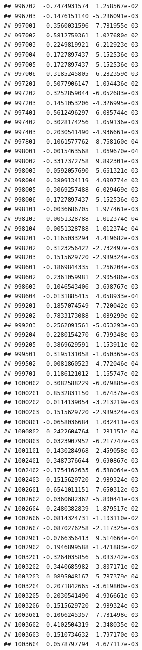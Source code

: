 \begin{frame}[fragile]
\begin{verbatim}
## 996702  -0.7474931574  1.258567e-02
## 996703  -0.1476151140 -5.286091e-03
## 997001  -0.3560031596 -7.781955e-03
## 997002  -0.5812759361  1.027680e-02
## 997003   0.2249819921 -6.212923e-03
## 997004  -0.1727897437  5.152536e-03
## 997005  -0.1727897437  5.152536e-03
## 997006  -0.3185245805  6.282359e-03
## 997201   0.5077906147 -1.094436e-02
## 997202   0.3252859044 -6.052683e-03
## 997203   0.1451053206 -4.326995e-03
## 997401  -0.5612496297  6.085744e-03
## 997402   0.3028174256  1.059136e-03
## 997403   0.2030541490 -4.936661e-03
## 997801   0.1061577762 -8.768160e-04
## 998001  -0.0015463568  1.069670e-04
## 998002  -0.3317372758  9.892301e-03
## 998003   0.0592057690  5.661321e-03
## 998004   0.3809134119  4.909774e-03
## 998005   0.3069257488 -6.029469e-03
## 998006  -0.1727897437  5.152536e-03
## 998101  -0.0036686705  1.977461e-03
## 998103  -0.0051328788  1.012374e-04
## 998104  -0.0051328788  1.012374e-04
## 998201  -0.1165033294  4.419682e-03
## 998202   0.3123256422 -2.732497e-03
## 998203   0.1515629720 -2.989324e-03
## 998601  -0.1869844335  1.266204e-03
## 998602   0.2361059981  2.905486e-03
## 998603   0.1046543406 -3.698767e-03
## 998604  -0.0131885415  4.058933e-04
## 999201  -0.1857074549 -7.720042e-03
## 999202   0.7833173088 -1.089299e-02
## 999203   0.2562091561 -5.053293e-03
## 999204  -0.2280154270  6.799348e-03
## 999205  -0.3869629591  1.153911e-02
## 999501   0.3195131058 -1.050365e-03
## 999502  -0.0081860523  4.772046e-04
## 999701   0.1186121012 -1.165747e-02
## 1000002  0.3082588229 -6.079885e-03
## 1000201  0.8532831150  1.674376e-03
## 1000202  0.0114139054 -3.213219e-03
## 1000203  0.1515629720 -2.989324e-03
## 1000801 -0.0658036684  1.032411e-03
## 1000802  0.2422604764 -1.281151e-04
## 1000803  0.0323907952 -6.217747e-03
## 1001101  0.1430284968  2.459058e-03
## 1002401  0.3487376644 -9.690867e-03
## 1002402 -0.1754162635  6.588064e-03
## 1002403  0.1515629720 -2.989324e-03
## 1002601 -0.6541011151  7.650312e-03
## 1002602  0.0360682362 -5.800441e-03
## 1002604 -0.2480382839 -1.879517e-02
## 1002606 -0.0814324731 -1.103110e-02
## 1002607 -0.0870276258 -2.117325e-03
## 1002901 -0.0766356413  9.514664e-04
## 1002902  0.1946899588 -1.471883e-02
## 1003201 -0.3264035856  5.083742e-03
## 1003202 -0.3440685982  3.807171e-02
## 1003203  0.0895048167 -5.787379e-04
## 1003204  0.2071842665 -3.619800e-03
## 1003205  0.2030541490 -4.936661e-03
## 1003206  0.1515629720 -2.989324e-03
## 1003601 -0.1066245357  7.781498e-03
## 1003602 -0.4102504319  2.348035e-02
## 1003603 -0.1510734632  1.797170e-03
## 1003604  0.0578797794  4.677117e-03

\end{verbatim}
\end{frame}
